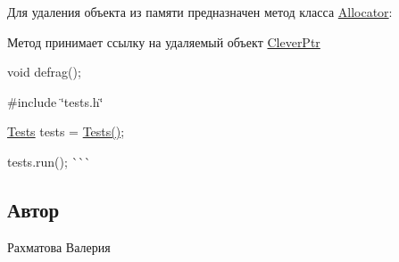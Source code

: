 Для удаления объекта из памяти предназначен метод класса \mbox{\hyperlink{class_allocator}{Allocator}}\+: 
\begin{DoxyCode}{0}
\end{DoxyCode}
 Метод принимает ссылку на удаляемый объект \mbox{\hyperlink{class_clever_ptr}{Clever\+Ptr}} 
\begin{DoxyCode}{0}
\end{DoxyCode}
 void defrag(); 
\begin{DoxyCode}{0}
\end{DoxyCode}
 \#include \char`\"{}tests.\+h\char`\"{} 
\begin{DoxyCode}{0}
\end{DoxyCode}
 \mbox{\hyperlink{class_tests}{Tests}} tests = \mbox{\hyperlink{class_tests}{Tests()}}; 
\begin{DoxyCode}{0}
\end{DoxyCode}
 tests.\+run(); \`{}\`{}\`{}

\subsection*{Автор}

Рахматова Валерия 